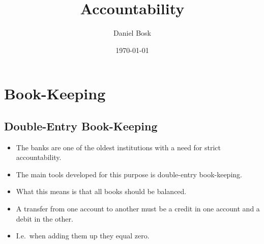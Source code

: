 \title{%
  Accountability
}
\author{Daniel Bosk}
\date{\today}


\begin{frame}
  \titlepage{}
\end{frame}

\begin{frame}
  \tableofcontents
\end{frame}





\section{Book-Keeping}

\subsection{Double-Entry Book-Keeping}

\begin{frame}
  \begin{itemize}
    \item The banks are one of the oldest institutions with a need for strict 
      accountability.

    \item The main tools developed for this purpose is double-entry 
      book-keeping.

    \item What this means is that all books should be balanced.

    \item A transfer from one account to another must be a credit in one 
      account and a debit in the other.

    \item I.e.\ when adding them up they equal zero.
  \end{itemize}
\end{frame}

